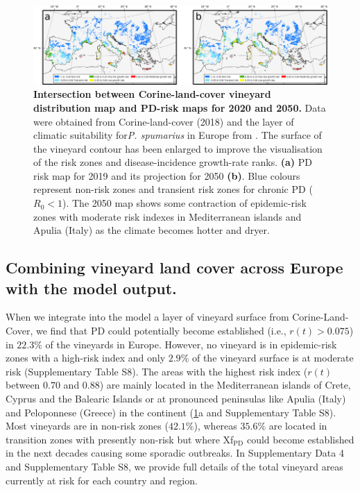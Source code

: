     \begin{figure}[H]
        \includegraphics[width=1\textwidth]{Figures/Fig6.png}
        \caption{\textbf{Intersection between Corine-land-cover vineyard
                distribution map and PD-risk maps for 2020 and 2050.}  Data
            were obtained from
            Corine-land-cover (2018) and the layer of climatic suitability
            for\textit{P.
                spumarius} in Europe from \cite{Godefroid2021}. The surface of
            the vineyard
            contour has been enlarged to improve the visualisation of the risk
            zones and
            disease-incidence growth-rate ranks. \textbf{(a)} PD risk map for
            2019 and its
            projection for 2050 \textbf{(b)}. Blue colours represent non-risk
            zones and
            transient risk zones for chronic PD ($R_0 < 1$). The 2050 map shows
            some
            contraction of epidemic-risk zones with moderate risk indexes in
            Mediterranean
            islands and Apulia (Italy) as the climate becomes hotter and
            dryer.}
        \label{fig6}
    \end{figure}

    \subsection{Combining vineyard land cover across Europe with the model
        output.}
    When we integrate into the model a layer of vineyard surface from
    Corine-Land-Cover, we find that PD could potentially become established
    (i.e.,
$r(t)>0.075$) in $22.3\%$ of the vineyards in Europe. However, no vineyard is
    in epidemic-risk zones with a high-risk index and only $2.9\%$ of the
    vineyard
    surface is at moderate risk (Supplementary Table S8). The areas with the
    highest risk index ($r(t)$ between $0.70$ and $0.88$) are mainly located in
    the
    Mediterranean islands of Crete, Cyprus and the Balearic Islands or at
    pronounced peninsulas like Apulia (Italy) and Peloponnese (Greece) in the
    continent (\cref{fig6}a and Supplementary Table S8).  Most vineyards are in
    non-risk zones ($42.1\%$), whereas $35.6\%$ are located in transition zones
    with presently non-risk but where Xf$_{\textrm{PD}}$ could become
    established
    in the next decades causing some sporadic outbreaks. In Supplementary Data
    4
    and Supplementary Table S8, we provide full details of the total vineyard
    areas
    currently at risk for each country and region.

